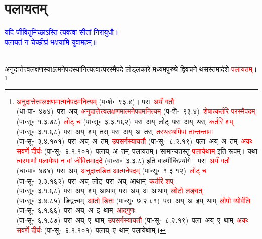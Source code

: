 \section[पलायतम्]{पलायतम्}
\centering\textcolor{blue}{यदि जीवितुमिच्छाऽस्ति त्यक्त्वा सीतां निरायुधौ।\nopagebreak\\
पलायतं न चेच्छीघ्रं भक्षयामि युवामहम्॥}\nopagebreak\\
\\
\fontsize{14}{21}\selectfont\begin{sloppypar}\justifying\noindent\hspace{10mm} अनुदात्तेत्त्व\-लक्षणस्याऽत्मनेपदस्यानित्यत्वात्परस्मैपदे लोड्लकारे मध्यम\-पुरुषे द्वि\-वचने थसस्तमादेशे \textcolor{red}{पलायतम्}।\footnote{\textcolor{red}{अनुदात्तेत्त्व\-लक्षणमात्मने\-पदमनित्यम्} (प॰शे॰~९३.४)। परा~\textcolor{red}{अयँ गतौ} (धा॰पा॰~४७४)~\arrow परा~अय्~\arrow \textcolor{red}{अनुदात्तेत्त्व\-लक्षणमात्मने\-पदमनित्यम्} (प॰शे॰~९३.४)~\arrow \textcolor{red}{शेषात्कर्तरि परस्मैपदम्} (पा॰सू॰~१.३.७८)~\arrow \textcolor{red}{लोट् च} (पा॰सू॰~३.३.१६२)~\arrow परा~अय्~लोट्~\arrow परा~अय्~थस्~\arrow \textcolor{red}{कर्तरि शप्‌} (पा॰सू॰~३.१.६८)~\arrow परा~अय्~शप्~तस्~\arrow परा~अय्~अ~तस्~\arrow \textcolor{red}{तस्थस्थमिपां तान्तन्तामः} (पा॰सू॰~३.४.१०१)~\arrow परा~अय्~अ~तम्~\arrow \textcolor{red}{उपसर्गस्यायतौ} (पा॰सू॰~८.२.१९)~\arrow पला~अय्~अ~तम्~\arrow \textcolor{red}{अकः सवर्णे दीर्घः} (पा॰सू॰~६.१.१०१)~\arrow पलाय्~अ~तम्~\arrow पलायतम्। सामान्यतस्तु \textcolor{red}{पलायेथाम्} इति रूपम्। यथा \textcolor{red}{त्वरमाणौ पलायेथां न वां जीवितमाददे} (वा॰रा॰~३.३.८) इति वाल्मीकि\-प्रयोगे। परा~\textcolor{red}{अयँ गतौ} (धा॰पा॰~४७४)~\arrow परा~अय्~\arrow \textcolor{red}{अनुदात्तङित आत्मने\-पदम्} (पा॰सू॰~१.३.१२)~\arrow \textcolor{red}{लोट् च} (पा॰सू॰~३.३.१६२)~\arrow परा~अय्~लोट्~\arrow परा~अय्~आथाम्~\arrow \textcolor{red}{कर्तरि शप्‌} (पा॰सू॰~३.१.६८)~\arrow परा~अय्~शप्~आथाम्~\arrow परा~अय्~अ~आथाम्~\arrow \textcolor{red}{लोटो लङ्वत्‌} (पा॰सू॰~३.४.८५)~\arrow ङिद्वत्त्वम्~\arrow \textcolor{red}{आतो ङितः} (पा॰सू॰~७.२.८१)~\arrow परा~अय्~अ~इय्~थाम्~\arrow \textcolor{red}{लोपो व्योर्वलि} (पा॰सू॰~६.१.६६)~\arrow परा~अय्~अ~इ~थाम्~\arrow \textcolor{red}{आद्गुणः} (पा॰सू॰~६.१.८७)~\arrow परा~अय्~ए~थाम्~\arrow \textcolor{red}{उपसर्गस्यायतौ} (पा॰सू॰~८.२.१९)~\arrow पला~अय्~ए~थाम्~\arrow \textcolor{red}{अकः सवर्णे दीर्घः} (पा॰सू॰~६.१.१०१)~\arrow पलाय्~ए~थाम्~\arrow पलायेथाम्।}\end{sloppypar}
